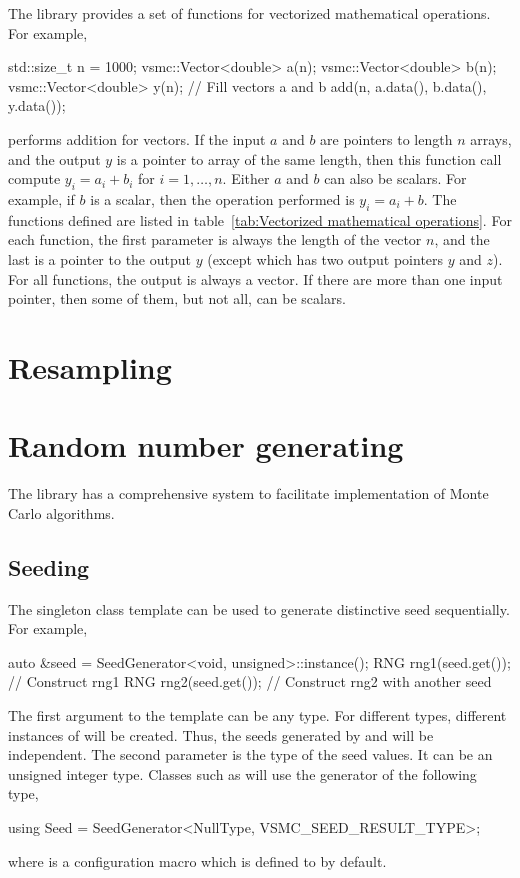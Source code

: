 \documentclass[11pt,bib,mint,hyper,altcolor]{marticle}
\begin{document}
The library provides a set of functions for vectorized mathematical operations.
For example,
\begin{cppcode}
  std::size_t n = 1000;
  vsmc::Vector<double> a(n);
  vsmc::Vector<double> b(n);
  vsmc::Vector<double> y(n);
  // Fill vectors a and b
  add(n, a.data(), b.data(), y.data());
\end{cppcode}
performs addition for vectors. If the input $a$ and $b$ are pointers to length
$n$ arrays, and the output $y$ is a pointer to array of the same length, then
this function call compute $y_i = a_i + b_i$ for $i=1,\dots,n$. Either $a$ and
$b$ can also be scalars. For example, if $b$ is a scalar, then the operation
performed is $y_i = a_i + b$. The functions defined are listed in
table~\ref{tab:Vectorized mathematical operations}. For each function, the
first parameter is always the length of the vector $n$, and the last is a
pointer to the output $y$ (except  which has two output
pointers $y$ and $z$). For all functions, the output is always a vector. If
there are more than one input pointer, then some of them, but not all, can be
scalars.

\section{Resampling}
\label{sec:Resampling}

\section{Random number generating}
\label{sec:Random number generating}

The library has a comprehensive \rng system to facilitate implementation of
Monte Carlo algorithms.

\subsection{Seeding}
\label{sub:Seeding}

The singleton class template  can be used to generate
distinctive seed sequentially. For example,
\begin{cppcode}
  auto &seed = SeedGenerator<void, unsigned>::instance();
  RNG rng1(seed.get()); // Construct rng1
  RNG rng2(seed.get()); // Construct rng2 with another seed
\end{cppcode}
The first argument to the template can be any type. For different types,
different instances of  will be created. Thus, the
seeds generated by  and
 will be independent. The second parameter is the
type of the seed values. It can be an unsigned integer type. Classes such as
 will use the generator of the following type,
\begin{cppcode}
  using Seed = SeedGenerator<NullType, VSMC_SEED_RESULT_TYPE>;
\end{cppcode}
where  is a configuration macro which is
defined to  by default.
\end{document}
